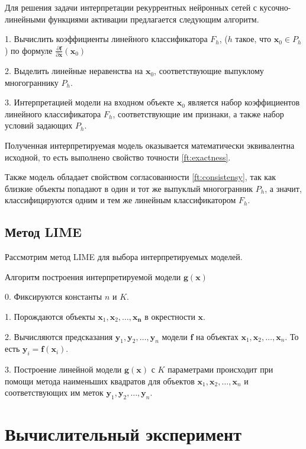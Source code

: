 \documentclass[a4paper, 12pt]{article}
\begin{document}
Для решения задачи интерпретации рекуррентных нейронных сетей с кусочно-линейными функциями активации предлагается следующим алгоритм.

1. Вычислить коэффициенты линейного классификатора $F_h$, ($h$ такое, что $\mathbf{x}_0\in P_h$) по формуле $\frac{\partial\mathbf{f}}{\partial\mathbf{x}}(\mathbf{x}_0)$

2. Выделить линейные неравенства на $\mathbf{x}_0$, соответствующие выпуклому многограннику $P_h$.

3. Интерпретацией модели на входном объекте $\mathbf{x}_0$ является набор коэффициентов линейного классификатора $F_h$, соответствующие им признаки, а также набор условий задающих $P_h$.

Полученная интерпретируемая модель оказывается математически эквивалентна исходной, то есть выполнено свойство точности \eqref{ft:exactness}.

Также модель обладает свойством согласованности \eqref{ft:consistensy}, так как близкие объекты попадают в один и тот же выпуклый многогранник $P_h$, а значит, классифицируются одним и тем же линейным классификатором $F_h$.

\subsection{Метод LIME}

Рассмотрим метод LIME \cite{ribeiro2016why} для выбора интерпретируемых моделей.

Алгоритм построения интерпретируемой модели $\mathbf{g}(\mathbf{x})$

0. Фиксируются константы $n$ и $K$.

1. Порождаются объекты $\mathbf{x}_1, \mathbf{x}_2, \dots, \mathbf{x_n}$ в окрестности $\mathbf{x}$.

2. Вычисляются предсказания $\mathbf{y}_1, \mathbf{y}_2, \dots, \mathbf{y}_n$ модели $\mathbf{f}$ на объектах $\mathbf{x}_1, \mathbf{x}_2, \dots, \mathbf{x}_n$. То есть $\mathbf{y}_i=\mathbf{f}(\mathbf{x}_i)$.

3. Построение линейной модели $\mathbf{g}(\mathbf{x})$ с $K$ параметрами происходит при помощи метода наименьших квадратов для объектов $\mathbf{x}_1, \mathbf{x}_2, \dots, \mathbf{x}_n$ и соответствующих им меток $\mathbf{y}_1, \mathbf{y}_2, \dots, \mathbf{y}_n$.  

\section{Вычислительный эксперимент}
\end{document}
